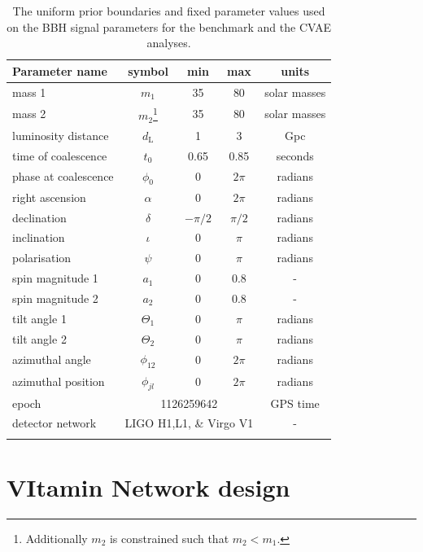 %
%
\begin{table}
\centering
\caption{The uniform prior boundaries and fixed parameter values used on the \ac{BBH} signal parameters for the benchmark
and the \ac{CVAE} analyses.}
\begin{minipage}{\linewidth}
\begin{tabular}[t]{lcccc}
\toprule
Parameter name & symbol & min & max & units \\
\hline
mass 1 & $m_1$ & 35 & 80 & solar masses \\
mass 2 & $m_2$\footnote{Additionally $m_2$ is constrained such that
$m_{2}<m_{1}$.} & 35 & 80 & solar masses \\
luminosity distance & $d_{\text{L}}$ & 1 & 3 & Gpc \\
time of coalescence & $t_{0}$ & 0.65 & 0.85 & seconds \\
phase at coalescence & $\phi_{0}$ & 0 & $2\pi$ & radians \\
right ascension & $\alpha$ & 0 & $2\pi$ & radians \\
declination & $\delta$ & $-\pi/2$ & $\pi/2$ & radians \\
inclination & $\iota$ & 0 & $\pi$ & radians \\
polarisation & $\psi$ & 0 & $\pi$ & radians \\
spin magnitude 1 & $a_1$ & 0 & 0.8 & - \\
spin magnitude 2 & $a_2$ & 0 & 0.8 & - \\
tilt angle 1 & $\Theta_1$ & 0 & $\pi$ & radians \\
tilt angle 2 & $\Theta_2$ & 0 & $\pi$ & radians \\
azimuthal angle & $\phi_{12}$ & 0 & $2\pi$ & radians \\
azimuthal position & $\phi_{jl}$ & 0 & $2\pi$ & radians \\
\hline
epoch & \multicolumn{3}{c}{1126259642} & GPS time \\
detector network & \multicolumn{3}{c}{LIGO H1,L1, \& Virgo V1} & - \\
\botrule
\end{tabular}
\label{tab:prior_ranges}
\end{minipage}
\end{table}

\section{VItamin Network design}\label{sec:network_design}
%
%

